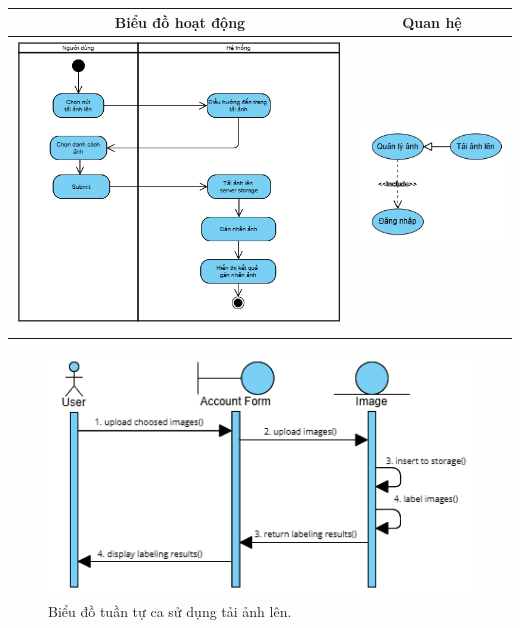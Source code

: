 \noindent 
\begin{tabular}{| c | c |}
    \hline
    \textbf{Biểu đồ hoạt động} & \textbf{Quan hệ} \\ 
    \hline
    \includegraphics[width=0.6\linewidth]{figures/c3/3-3-4-activity-diagram.png} 
    & 
    \includegraphics[width=0.35\linewidth]{figures/c3/3-3-4-relationship.png} \\ 
    \hline
\end{tabular}

\begin{figure}[H]
    \centering  
    \includegraphics[width=1\textwidth]{figures/c3/3-3-4-sequence-diagram.png}
    \caption{Biểu đồ tuần tự ca sử dụng tải ảnh lên.}
    \label{fig:3-3-4-sequence-diagram}
\end{figure}